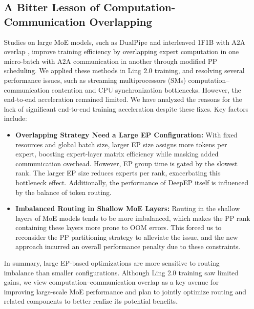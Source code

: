 \subsection{A Bitter Lesson of Computation-Communication Overlapping}

Studies on large MoE models, such as DualPipe and interleaved 1F1B with A2A overlap \citep{deepseekai2024deepseekv3technicalreport,NeMo}, improve training efficiency by overlapping expert computation in one micro-batch with A2A communication in another through modified PP scheduling.
We applied these methods in Ling 2.0 training, and resolving several performance issues, such as streaming multiprocessors (SMs) computation–communication contention and CPU synchronization bottlenecks.
However, the end-to-end acceleration remained limited. We have analyzed the reasons for the lack of significant end-to-end training acceleration despite these fixes. Key factors include:

\begin{itemize}[leftmargin=1.5em]
    \item \textbf{Overlapping Strategy Need a Large EP Configuration:} With fixed resources and global batch size, larger EP size assigns more tokens per expert, boosting expert-layer matrix efficiency while masking added communication overhead. However, EP group time is gated by the slowest rank. The larger EP size reduces experts per rank, exacerbating this bottleneck effect. Additionally, the performance of DeepEP itself is influenced by the balance of token routing.
    \item \textbf{Imbalanced Routing in Shallow MoE Layers:} Routing in the shallow layers of MoE models tends to be more imbalanced, which makes the PP rank containing these layers more prone to OOM errors. This forced us to reconsider the PP partitioning strategy to alleviate the issue, and the new approach incurred an overall performance penalty due to these constraints.
\end{itemize}

In summary, large EP-based optimizations are more sensitive to routing imbalance than smaller configurations.
Although Ling 2.0 training saw limited gains, we view computation–communication overlap as a key avenue for improving large-scale MoE performance and plan to jointly optimize routing and related components to better realize its potential benefits.
